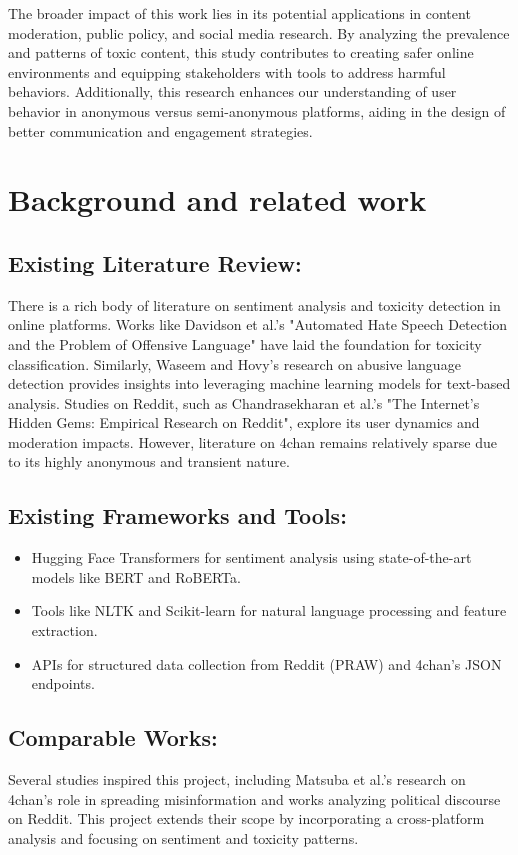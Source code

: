 \documentclass[sigconf]{acmart}
\begin{document}
The broader impact of this work lies in its potential applications in content moderation, public policy, and social media research. By analyzing the prevalence and patterns of toxic content, this study contributes to creating safer online environments and equipping stakeholders with tools to address harmful behaviors. Additionally, this research enhances our understanding of user behavior in anonymous versus semi-anonymous platforms, aiding in the design of better communication and engagement strategies.

\section{Background and related work}
\subsection{Existing Literature Review:}
There is a rich body of literature on sentiment analysis and toxicity detection in online platforms. Works like Davidson et al.'s "Automated Hate Speech Detection and the Problem of Offensive Language" have laid the foundation for toxicity classification. Similarly, Waseem and Hovy's research on abusive language detection provides insights into leveraging machine learning models for text-based analysis. Studies on Reddit, such as Chandrasekharan et al.'s "The Internet's Hidden Gems: Empirical Research on Reddit", explore its user dynamics and moderation impacts. However, literature on 4chan remains relatively sparse due to its highly anonymous and transient nature.

\subsection{Existing Frameworks and Tools:}
\begin{itemize}
    \item Hugging Face Transformers for sentiment analysis using state-of-the-art models like BERT and RoBERTa.
    \item Tools like NLTK and Scikit-learn for natural language processing and feature extraction.
    \item APIs for structured data collection from Reddit (PRAW) and 4chan’s JSON endpoints.
\end{itemize}


\subsection{Comparable Works:}
Several studies inspired this project, including Matsuba et al.'s research on 4chan’s role in spreading misinformation and works analyzing political discourse on Reddit. This project extends their scope by incorporating a cross-platform analysis and focusing on sentiment and toxicity patterns.\newline
\end{document}

